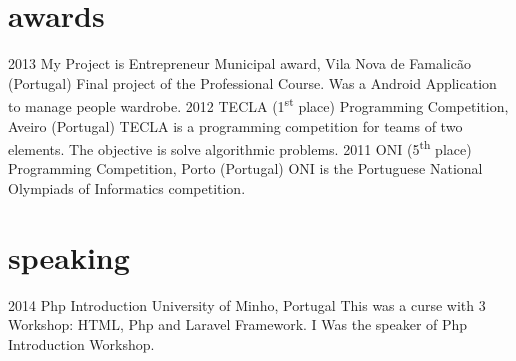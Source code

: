 \documentclass[]{friggeri-cv} %
\begin{document}
\section{awards}

\begin{entrylist}
\entry
{2013}
{My Project is Entrepreneur}
{Municipal award, Vila Nova de Famalicão (Portugal)}
{Final project of the Professional Course. Was a Android Application to manage people wardrobe.}
\entry
{2012}
{TECLA (1\textsuperscript{st} place)}
{Programming Competition, Aveiro (Portugal)}
{TECLA is a programming competition for teams of two elements. The objective is solve algorithmic problems.}
\entry
{2011}
{ONI (5\textsuperscript{th} place)}
{Programming Competition, Porto (Portugal)}
{ONI is the Portuguese National Olympiads of Informatics competition.}

\end{entrylist}


\section{speaking}
\begin{entrylist}
    \entry
    {2014}
    {Php Introduction}
    {University of Minho, Portugal}
    {This was a curse with 3 Workshop: HTML, Php and Laravel Framework. I Was the speaker of Php Introduction Workshop.}
\end{entrylist}

\newpage
\end{document}
